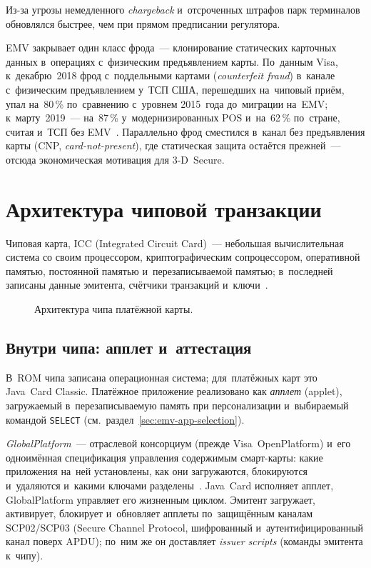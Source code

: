 Из-за угрозы немедленного \textit{chargeback} и~отсроченных штрафов парк терминалов
обновлялся быстрее, чем при прямом предписании регулятора.

EMV закрывает один класс фрода~--- клонирование статических карточных
данных в~операциях с~физическим предъявлением карты. По~данным Visa,
к~декабрю~2018 фрод с~поддельными картами (\textit{counterfeit fraud})
в~канале с~физическим предъявлением у~ТСП США, перешедших на~чиповый приём,
упал на~80\,\% по~сравнению с~уровнем 2015~года до~миграции на~EMV;
к~марту~2019~--- на~87\,\% у~модернизированных POS и~на~62\,\% по~стране,
считая и~ТСП без EMV~\cite{visa-emv-fraud-2019,american-banker-emv-2019}.
Параллельно фрод сместился в~канал без предъявления карты (CNP,
\textit{card-not-present}), где статическая защита остаётся прежней~--- отсюда
экономическая мотивация для 3-D~Secure.

\section{Архитектура чиповой транзакции}\label{sec:emv-architecture}

Чиповая карта, ICC (Integrated Circuit Card)~--- небольшая вычислительная
система со своим процессором, криптографическим сопроцессором, оперативной
памятью, постоянной памятью и~перезаписываемой памятью; в~последней записаны
данные эмитента, счётчики транзакций и~ключи~\cite{emvco-book1}.

\begin{figure}[tbp]
  \centering
  \caption{Архитектура чипа платёжной карты.}\label{fig:emv-chip-architecture}
  \medskip
\end{figure}

\subsection*{Внутри чипа: апплет и~аттестация}\label{sec:emv-chip-internals}

В~ROM чипа записана операционная система; для~платёжных карт это Java~Card
Classic. Платёжное приложение реализовано как \textit{апплет} (applet),
загружаемый в~перезаписываемую память при персонализации и~выбираемый командой
\texttt{SELECT} (см.~раздел~\ref{sec:emv-app-selection}).

\emph{GlobalPlatform}~--- отраслевой консорциум (прежде Visa~OpenPlatform)
и~его одноимённая спецификация управления содержимым смарт-карты: какие
приложения на~ней установлены, как они загружаются, блокируются и~удаляются
и~какими ключами разделены~\cite{globalplatform-card}. Java~Card исполняет
апплет, GlobalPlatform управляет его жизненным циклом. Эмитент загружает, активирует,
блокирует и~обновляет апплеты по~защищённым каналам SCP02\slash SCP03
(Secure Channel Protocol, шифрованный и~аутентифицированный канал поверх APDU);
по~ним же он доставляет \textit{issuer scripts} (команды эмитента к~чипу).

